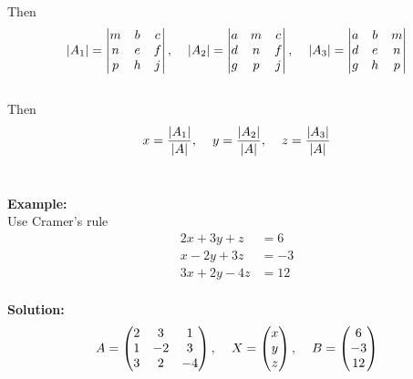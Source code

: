 \documentclass[11pt,a4paper]{article}
\begin{document}
\begin{enumerate}
Then
$$|A_1|=
\begin{vmatrix}
m & b & c\\
n & e & f\\
p & h & j\\
\end{vmatrix}
,\hspace{0.4cm} |A_2|=
\begin{vmatrix}
a & m & c\\
d & n & f\\
g & p & j\\
\end{vmatrix}
,\hspace{0.4cm}
|A_3|=
\begin{vmatrix}
a & b & m\\
d & e & n\\
g & h & p\\
\end{vmatrix}
$$\\

Then
$$x=\frac{|A_1|}{|A|},\hspace{0.4cm}  y=\frac{|A_2|}{|A|},\hspace{0.4cm} z=\frac{|A_3|}{|A|}$$\\
\end{enumerate}

\textbf{Example:}\\ Use Cramer's rule
\begin{align*}
2x+3y+z & =6\\
x-2y+3z &=-3\\
3x+2y-4z & =12\\
\end{align*}

\textbf{Solution:}
$$A=
\begin{pmatrix}
2 & 3 & 1\\
1 & -2 & 3\\
3 & 2 & -4\\
\end{pmatrix}
,\hspace{0.4cm} X=
\begin{pmatrix}
x\\y\\z\\
\end{pmatrix}
,\hspace{0.4cm} 
B=
\begin{pmatrix}
6\\-3\\12\\
\end{pmatrix}
$$
\end{document}
